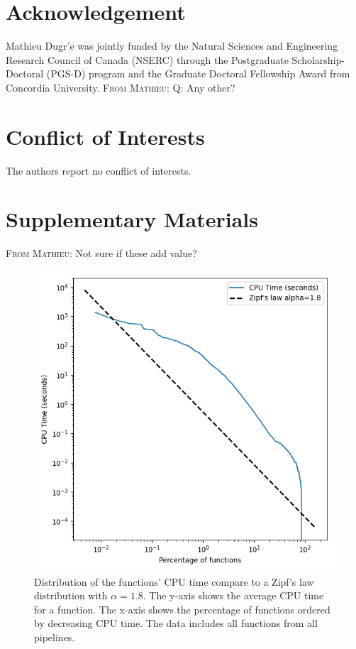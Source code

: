 \documentclass[conference]{IEEEtran}
\newcommand{\MD}[1]{\color{magenta}\textsc{From Mathieu: }#1\color{black}}
\begin{document}
\section*{Acknowledgement}
Mathieu Dugr'e was jointly funded by the Natural Sciences and Engineering Research Council of Canada (NSERC) through the Postgraduate Scholarship-Doctoral (PGS-D) program and the Graduate Doctoral Fellowship Award from Concordia University.
\MD{Q: Any other?}
													
\section*{Conflict of Interests}
The authors report no conflict of interests.
													

% 

													
\newpage
\onecolumn
\section*{Supplementary Materials}
\MD{Not sure if these add value?}
\label{sec:supplementary}

\begin{figure}[ht]
	\centering
	\includegraphics{figures/global-zipf_law.png}
	\caption{Distribution of the functions' CPU time compare to a Zipf's law distribution with $\alpha=1.8$. The y-axis shows the average CPU time for a function. The x-axis shows the percentage of functions ordered by decreasing CPU time. The data includes all functions from all pipelines.}
	\label{sup-fig:zips-law}
\end{figure}
													
\end{document}
